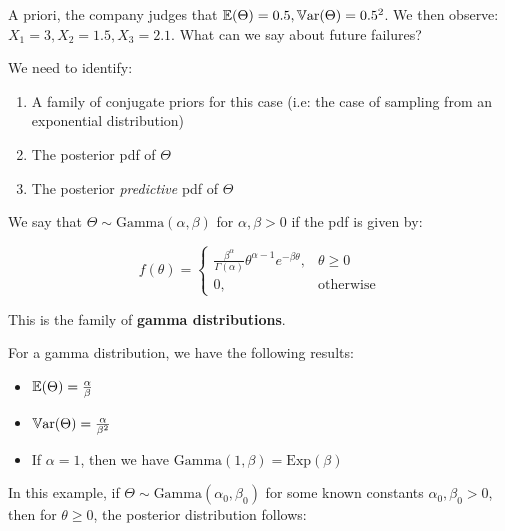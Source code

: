 \documentclass[a4paper]{article}
\begin{document}
                A priori, the company judges that $\mathbb{E}(\Theta) = 0.5,
                \mathbb{V}\text{ar}(\Theta) = 0.5^2$. We then observe: $X_1 = 3,
                X_2 = 1.5, X_3 = 2.1$. What can we say about future failures?

                We need to identify:

                \begin{enumerate}
                    \item A family of conjugate priors for this case (i.e: the
                        case of sampling from an exponential distribution)
                    \item The posterior pdf of $\Theta$
                    \item The posterior \textit{predictive} pdf of $\Theta$
                \end{enumerate}

                \begin{definition}
                    We say that $\Theta \sim \text{Gamma}(\alpha, \beta)$ for
                    $\alpha, \beta > 0$ if the pdf is given by:

                    \[
                        f(\theta) = \begin{cases}\frac{\beta^\alpha}
                        {\Gamma(\alpha)} \theta^{\alpha - 1} e^{-\beta\theta},
                        & \theta \geq 0 \\ 0, & \text{otherwise}\end{cases}
                    \]

                    This is the family of \textbf{gamma distributions}.

                    For a gamma distribution, we have the following results:

                    \begin{itemize}
                        \item $\mathbb{E}(\Theta) = \frac{\alpha}{\beta}$
                        \item $\mathbb{V}\text{ar}(\Theta) = \frac{\alpha}{\beta^2}$
                        \item If $\alpha = 1$, then we have $\text{Gamma}(1,
                            \beta) = \text{Exp}(\beta)$
                    \end{itemize}
                \end{definition}

                In this example, if $\Theta \sim \text{Gamma}(\alpha_0,
                \beta_0)$ for some known constants $\alpha_0, \beta_0 > 0$, then
                for $\theta \geq 0$, the posterior distribution follows:
\end{document}
